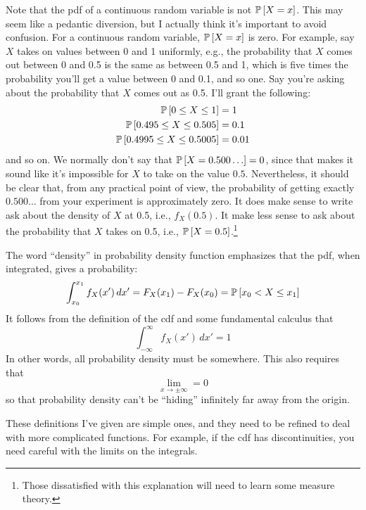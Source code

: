 Note that the pdf of a continuous random variable is not $\mathbb{P}\left[{X = x}\right]$. This
may seem like a pedantic diversion, but I actually think it's important to
avoid confusion. For a continuous random variable, $\mathbb{P}\left[{X = x}\right]$ is zero. For
example, say $X$ takes on values between 0 and 1 uniformly, e.g., the
probability that $X$ comes out between 0 and 0.5 is the same as between 0.5
and 1, which is five times the probability you'll get a value between 0 and
0.1, and so one. Say you're asking about the probability that $X$ comes out as
0.5. I'll grant the following:
\begin{align*}
\mathbb{P}\left[{0 \leq X \leq 1}\right] &= 1 \\
\mathbb{P}\left[{0.495 \leq X \leq 0.505}\right] &= 0.1 \\
\mathbb{P}\left[{0.4995 \leq X \leq 0.5005}\right] &= 0.01
\end{align*}
and so on. We normally don't say that $\mathbb{P}\left[{X = 0.500\ldots}\right] = 0$, since that
makes it sound like it's impossible for $X$ to take on the value $0.5$.
Nevertheless, it should be clear that, from any practical point of view, the
probability of getting exactly $0.500\ldots$ from your experiment is
approximately zero. It does make sense to write ask about the density of $X$
at 0.5, i.e., $f_X(0.5)$. It make less sense to ask about the probability that
$X$ takes on 0.5, i.e., $\mathbb{P}\left[{X = 0.5}\right]$.\footnote{Those dissatisfied with
this explanation will need to learn some measure theory.}

The word ``density'' in probability density function emphasizes that the pdf,
when integrated, gives a probability:
\begin{equation}\label{eq:integrated_pdf}
\int_{x_0}^{x_1} f_X(x') \,dx' = F_X(x_1) - F_X(x_0) = \mathbb{P}\left[{x_0 < X \leq x_1}\right]
\end{equation}
It follows from the definition of the cdf and
some fundamental calculus that
\begin{equation}
\int_{-\infty}^\infty f_X(x') \,dx' = 1
\end{equation}
In other words, all probability density must be somewhere. This also requires that
\begin{equation}
\lim_{x \to \pm \infty} = 0
\end{equation}
so that probability density can't be ``hiding'' infinitely far away from the origin.

These definitions I've given are simple ones, and they need to be refined to
deal with more complicated functions. For example, if the cdf has
discontinuities, you need careful with the limits on the integrals.

